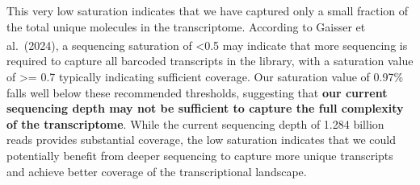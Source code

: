 \documentclass[
  11pt,
  a4paper,
]{report}
\begin{document}
\begin{tcolorbox}[enhanced jigsaw, arc=.35mm, colbacktitle=quarto-callout-warning-color!10!white, rightrule=.15mm, title=\textcolor{quarto-callout-warning-color}{\faExclamationTriangle}\hspace{0.5em}{Warning}, coltitle=black, bottomrule=.15mm, left=2mm, opacityback=0, colback=white, toprule=.15mm, toptitle=1mm, titlerule=0mm, breakable, bottomtitle=1mm, opacitybacktitle=0.6, colframe=quarto-callout-warning-color-frame, leftrule=.75mm]

This very low saturation indicates that we have captured only a small
fraction of the total unique molecules in the transcriptome. According
to Gaisser et
al.~(2024)\textsuperscript{}, a sequencing
saturation of \textless0.5 may indicate that more sequencing is required
to capture all barcoded transcripts in the library, with a saturation
value of \textgreater= 0.7 typically indicating sufficient coverage. Our
saturation value of 0.97\% falls well below these recommended
thresholds, suggesting that \textbf{our current sequencing depth may not
be sufficient to capture the full complexity of the transcriptome}.
While the current sequencing depth of 1.284 billion reads provides
substantial coverage, the low saturation indicates that we could
potentially benefit from deeper sequencing to capture more unique
transcripts and achieve better coverage of the transcriptional
landscape.

\end{tcolorbox}
\end{document}
